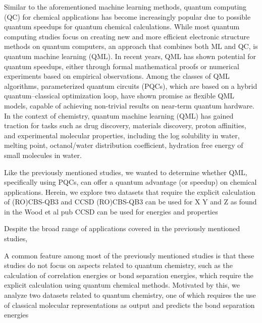 \documentclass[journal=jacsat,manuscript=article]{achemso}
\begin{document}
Similar to the aforementioned machine learning methods, quantum computing (QC) for chemical applications has become increasingly popular due to possible quantum speedups for quantum chemical calculations.\cite{cao_quantum_2019}
While most quantum computing studies focus on creating new and more efficient electronic structure methods on quantum computers\cite{romero_strategies_2019,mcardle_quantum_2020,bauer_quantum_2020,cao_quantum_2019}, an approach that combines both ML and QC, is quantum machine learning (QML).
In recent years, QML has shown potential for quantum speedups, either through formal mathematical proofs or numerical experiments based on empirical observations.\cite{biamonte_quantum_2017}
Among the classes of QML algorithms, parameterized quantum circuits (PQCs), which are based on a hybrid quantum--classical optimization loop, have shown promise as flexible QML models, capable of achieving non-trivial results on near-term quantum hardware.\cite{benedetti_parameterized_2019,suzuki_predicting_2020}
In the context of chemistry, quantum machine learning (QML) has gained traction for tasks such as drug discovery\cite{suzuki_predicting_2020,smaldone_quantum--classical_2024,bhatia_quantum_2023,kao_exploring_2023,li_quantum_2021,avramouli_quantum_2023,avramouli_unlocking_2023}, materials discovery\cite{ishiyama_noise-robust_2022,ryu_quantum_2023,vitz_hybrid_2024}, proton affinities\cite{jin_integrating_2025}, and experimental molecular properties, including the log solubility in water, melting point, octanol/water distribution coefficient, hydration free energy of small molecules in water.\cite{hatakeyama-sato_quantum_2023}


Like the previously mentioned studies, we wanted to determine whether QML, specifically using PQCs, can offer a quantum advantage (or speedup) on chemical applications.
Herein, we explore two datasets that require the explicit calculation of (RO)CBS-QB3 and CCSD
(RO)CBS-QB3  can be used for X Y and Z as found in the Wood et al pub
CCSD can be used for energies and properties

Despite the broad range of applications covered in the previously mentioned studies, 


A common feature among most of the previously mentioned studies is that these studies do not focus on aspects related to quantum chemistry, such as the calculation of correlation energies or bond separation energies, which require the explicit calculation using quantum chemical methods.
Motivated by this, we analyze two datasets related to quantum chemistry, one of which requires the use of classical molecular representations as output and predicts the bond separation energies 
\end{document}
